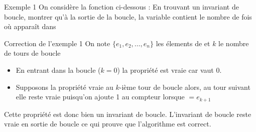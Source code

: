 \documentclass[10pt]{beamer}
\begin{document}
\begin{frame}[fragile]{\Ctitle}{\stitle}
\begin{exampleblock}{Exemple 1}
    On considère la fonction ci-dessous :
     En trouvant un invariant de boucle, montrer qu'à la sortie de la boucle, la variable  contient le nombre de fois où  apparaît dans 
\end{exampleblock}
\end{frame}


\begin{frame}[fragile]{\Ctitle}{\stitle}
\begin{exampleblock}{Correction de l'exemple 1}
    \textcolor{OliveGreen}{On note  $\{ e_1, e_2, \dots, e_n \}$ les élements de  et  $k$ le nombre de tours de boucle\\}
    \begin{itemize}
        \item<4-> \textcolor{OliveGreen}{En entrant dans la boucle ($k=0$) la propriété est vraie car  vaut 0.}
        \item<5-> \textcolor{OliveGreen}{Supposons la propriété vraie au $k$-ième tour de boucle alors, au tour suivant elle reste vraie puisqu'on ajoute 1 au compteur lorsque $=e_{k+1}$}
    \end{itemize}
    \textcolor{OliveGreen}{Cette propriété est donc bien un invariant de boucle.}
    \textcolor{OliveGreen}{L'invariant de boucle reste vraie en sortie de boucle ce qui prouve que l'algorithme est correct.}
\end{exampleblock}
\end{frame}
\end{document}
